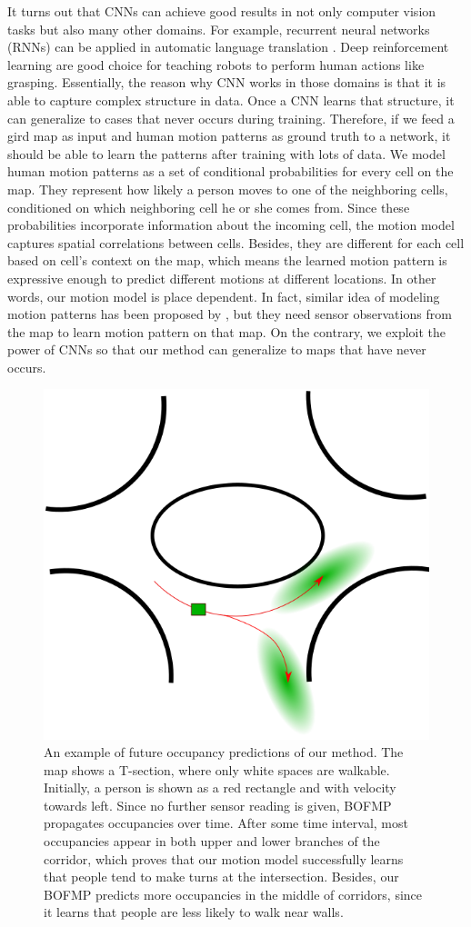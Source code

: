 It turns out that CNNs can achieve good results in not only computer vision tasks but also many other domains. For example, recurrent neural networks (RNNs) can be applied in automatic language translation \citep{cho2014learning}. Deep reinforcement learning are good choice for teaching robots to perform human actions like grasping\citep{levine2016learning}. Essentially, the reason why CNN works in those domains is that it is able to capture complex structure in data. Once a CNN learns that structure, it can generalize to cases that never occurs during training. Therefore, if we feed a gird map as input and human motion patterns as ground truth to a network, it should be able to learn the patterns after training with lots of data. We model human motion patterns as a set of conditional probabilities for every cell on the map. They represent how likely a person moves to one of the neighboring cells, conditioned on which neighboring cell he or she comes from. Since these probabilities incorporate information about the incoming cell, the motion model captures spatial correlations between cells. Besides, they are different for each cell based on cell's context on the map, which means the learned motion pattern is expressive enough to predict different motions at different locations. In other words, our motion model is place dependent. In fact, similar idea of modeling motion patterns has been proposed by \cite{kucner2013conditional}, but they need sensor observations from the map to learn motion pattern on that map. On the contrary, we exploit the power of CNNs so that our method can generalize to maps that have never occurs.

\begin{figure}[H]
  \centering
    \includegraphics[width=.5\textwidth]{figures/roundabout.png}
    \caption[An example of future occupancy predictions of our method.]{An example of future occupancy predictions of our method.  The map shows a T-section, where only white spaces are walkable. Initially, a person is shown as a red rectangle and with velocity towards left. Since no further sensor reading is given, BOFMP propagates occupancies over time. After some time interval, most occupancies appear in both upper and lower branches of the corridor, which proves that our motion model successfully learns that people tend to make turns at the intersection. Besides, our BOFMP predicts more occupancies in the middle of corridors, since it learns that people are less likely to walk near walls.}
    \label{fig:idea}
\end{figure}

